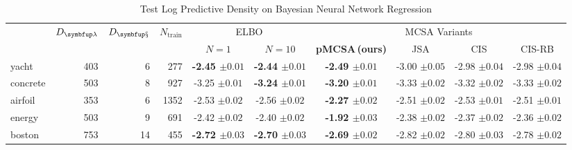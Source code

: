 
\begin{table*}
  \vspace{-0.1in}
  \centering
  \caption{Test Log Predictive Density on Bayesian Neural Network Regression}\label{table:gp}
  \vspace{-0.05in}
  \setlength{\tabcolsep}{2pt}
  \begin{threeparttable}
  \begin{tabular}{lrrrcccccc}
    \toprule
    & \multicolumn{1}{c}{\multirow{2}{*}{\(D_{\mathcal{\vlambda}}\)}} & \multicolumn{1}{c}{\multirow{2}{*}{\(D_{\mathcal{\vx}}\)}} &  \multicolumn{1}{c}{\multirow{2}{*}{\(N_{\text{train}}\)}} & \multicolumn{2}{c}{\multirow{1}{*}{ELBO}} & \multicolumn{4}{c}{MCSA Variants} \\\cmidrule(lr){5-6}\cmidrule(lr){7-10}
  & & & & {\footnotesize\(N=1\)} & {\footnotesize\(N=10\)} & \multicolumn{1}{c}{\multirow{1}{*}{\footnotesize{\textbf{pMCSA{\scriptsize\,(ours)}}}}} & \multicolumn{1}{c}{\multirow{1}{*}{\footnotesize{JSA}}} & \multicolumn{1}{c}{\multirow{1}{*}{\footnotesize{CIS}}} & \multicolumn{1}{c}{\multirow{1}{*}{\footnotesize{CIS-RB}}}\\
    \midrule
    yacht & 403 & 6 & 277 & {\bf-2.45 {\scriptsize{\(\pm 0.01\)}}} & {\bf-2.44 {\scriptsize{\(\pm 0.01\)}}} & {\bf-2.49 {\scriptsize{\(\pm 0.01\)}}} & {-3.00 {\scriptsize{\(\pm 0.05\)}}} & {-2.98 {\scriptsize{\(\pm 0.04\)}}} & {-2.98 {\scriptsize{\(\pm 0.04\)}}}\\
    concrete & 503 & 8 & 927 & {-3.25 {\scriptsize{\(\pm 0.01\)}}} & {\bf-3.24 {\scriptsize{\(\pm 0.01\)}}} & {\bf-3.20 {\scriptsize{\(\pm 0.01\)}}} & {-3.33 {\scriptsize{\(\pm 0.02\)}}} & {-3.32 {\scriptsize{\(\pm 0.02\)}}} & {-3.33 {\scriptsize{\(\pm 0.02\)}}}\\
    airfoil & 353 & 6 & 1352 & {-2.53 {\scriptsize{\(\pm 0.02\)}}} & {-2.56 {\scriptsize{\(\pm 0.02\)}}} & {\bf-2.27 {\scriptsize{\(\pm 0.02\)}}} & {-2.51 {\scriptsize{\(\pm 0.02\)}}} & {-2.53 {\scriptsize{\(\pm 0.01\)}}} & {-2.51 {\scriptsize{\(\pm 0.01\)}}}\\
    energy & 503 & 9 & 691 & {-2.42 {\scriptsize{\(\pm 0.02\)}}} & {-2.40 {\scriptsize{\(\pm 0.02\)}}} & {\bf-1.92 {\scriptsize{\(\pm 0.03\)}}} & {-2.38 {\scriptsize{\(\pm 0.02\)}}} & {-2.37 {\scriptsize{\(\pm 0.02\)}}} & {-2.36 {\scriptsize{\(\pm 0.02\)}}}\\
    boston & 753 & 14 & 455 & {\bf-2.72 {\scriptsize{\(\pm 0.03\)}}} & {\bf-2.70 {\scriptsize{\(\pm 0.03\)}}} & {\bf-2.69 {\scriptsize{\(\pm 0.02\)}}} & {-2.82 {\scriptsize{\(\pm 0.02\)}}} & {-2.80 {\scriptsize{\(\pm 0.03\)}}} & {-2.78 {\scriptsize{\(\pm 0.02\)}}}\\

\end{tabular}
\end{threeparttable}
\end{table*}
